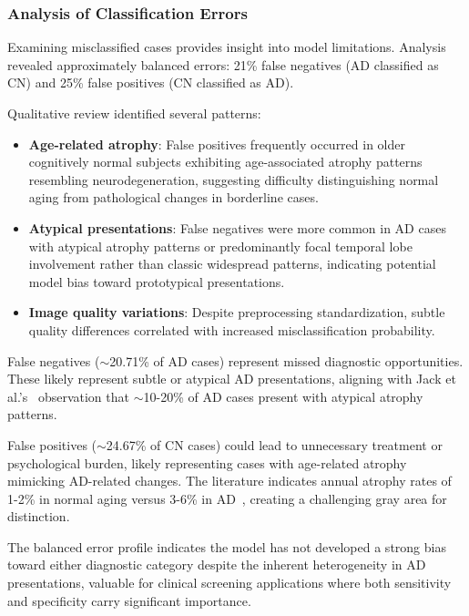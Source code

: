 \documentclass[12pt, a4paper]{article}
\begin{document}
\subsubsection{Analysis of Classification Errors}

Examining misclassified cases provides insight into model limitations. Analysis revealed approximately balanced errors: 21\% false negatives (AD classified as CN) and 25\% false positives (CN classified as AD).

Qualitative review identified several patterns:

\begin{itemize}
    \item \textbf{Age-related atrophy}: False positives frequently occurred in older cognitively normal subjects exhibiting age-associated atrophy patterns resembling neurodegeneration, suggesting difficulty distinguishing normal aging from pathological changes in borderline cases.
    
    \item \textbf{Atypical presentations}: False negatives were more common in AD cases with atypical atrophy patterns or predominantly focal temporal lobe involvement rather than classic widespread patterns, indicating potential model bias toward prototypical presentations.
    
    \item \textbf{Image quality variations}: Despite preprocessing standardization, subtle quality differences correlated with increased misclassification probability.
\end{itemize}

False negatives ($\sim$20.71\% of AD cases) represent missed diagnostic opportunities. These likely represent subtle or atypical AD presentations, aligning with Jack et al.'s~\cite{jack2013tracking} observation that $\sim$10-20\% of AD cases present with atypical atrophy patterns.

False positives ($\sim$24.67\% of CN cases) could lead to unnecessary treatment or psychological burden, likely representing cases with age-related atrophy mimicking AD-related changes. The literature indicates annual atrophy rates of 1-2\% in normal aging versus 3-6\% in AD~\cite{vemuri2010role}, creating a challenging gray area for distinction.

The balanced error profile indicates the model has not developed a strong bias toward either diagnostic category despite the inherent heterogeneity in AD presentations, valuable for clinical screening applications where both sensitivity and specificity carry significant importance.
\end{document}
